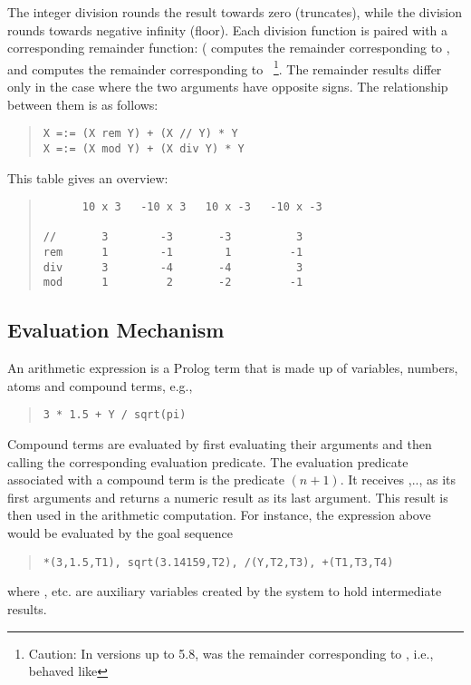 The integer division \notation{//} rounds the result towards zero (truncates),
while the  division rounds towards negative infinity (floor).
Each division function is paired with a corresponding remainder function:
( computes the remainder corresponding to \notation{//}, and
computes the remainder corresponding to \
\footnote{%
  Caution: In {\eclipse} versions up to 5.8,  was the
  remainder corresponding to \notation{//}, i.e., behaved like }.
The remainder results differ only in the case where the two arguments
have opposite signs.  The relationship between them is as follows:
\begin{quote}
\begin{verbatim}
X =:= (X rem Y) + (X // Y) * Y
X =:= (X mod Y) + (X div Y) * Y
\end{verbatim}
\end{quote}
This table gives an overview:
\begin{quote}
\begin{verbatim}
      10 x 3   -10 x 3   10 x -3   -10 x -3

//       3        -3       -3          3
rem      1        -1        1         -1
div      3        -4       -4          3
mod      1         2       -2         -1
\end{verbatim}
\end{quote}

\subsection{Evaluation Mechanism}

An arithmetic expression is a Prolog term that is made up of variables,
numbers, atoms and compound terms, e.g.,
\begin{quote}
\begin{verbatim}
3 * 1.5 + Y / sqrt(pi)
\end{verbatim}\end{quote}
Compound terms are evaluated by first evaluating their arguments and then
calling the corresponding evaluation predicate.
The evaluation predicate associated with a compound term
is the predicate $(n+1)$. It receives
,.., as its first
 arguments and returns a numeric result as its last argument.
This result is then used in the arithmetic computation.
For instance, the expression above would be evaluated by the goal sequence
\begin{quote}
\begin{verbatim}
*(3,1.5,T1), sqrt(3.14159,T2), /(Y,T2,T3), +(T1,T3,T4)
\end{verbatim}\end{quote}
where ,  etc. are auxiliary variables created by the system
to hold
intermediate results.

